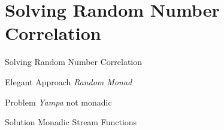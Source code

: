 \documentclass{beamer}
\begin{document}
%    

\section{Solving Random Number Correlation}
\begin{frame}{Solving Random Number Correlation}
  \begin{block}{Elegant Approach}
  	\textit{Random Monad}
  \end{block} 
  
  \begin{block}{Problem}
  	\textit{Yampa} not monadic
  \end{block}
  
  \begin{block}{Solution}
    Monadic Stream Functions 
  \end{block}
\end{frame}
\end{document}
